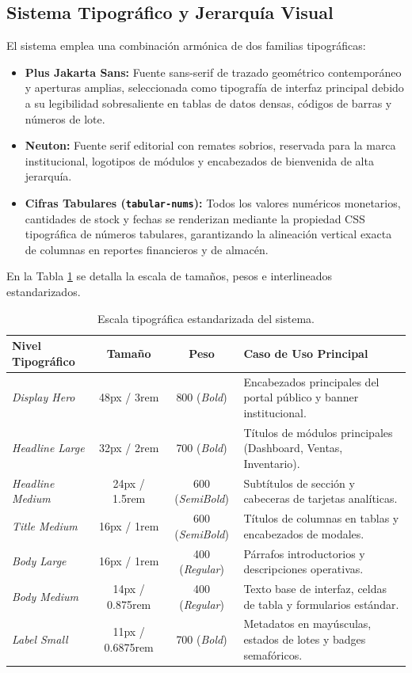 \subsection{Sistema Tipográfico y Jerarquía Visual}
El sistema emplea una combinación armónica de dos familias tipográficas:
\begin{itemize}
    \item \textbf{Plus Jakarta Sans:} Fuente sans-serif de trazado geométrico contemporáneo y aperturas amplias, seleccionada como tipografía de interfaz principal debido a su legibilidad sobresaliente en tablas de datos densas, códigos de barras y números de lote.
    \item \textbf{Neuton:} Fuente serif editorial con remates sobrios, reservada para la marca institucional, logotipos de módulos y encabezados de bienvenida de alta jerarquía.
    \item \textbf{Cifras Tabulares (\texttt{tabular-nums}):} Todos los valores numéricos monetarios, cantidades de stock y fechas se renderizan mediante la propiedad CSS tipográfica de números tabulares, garantizando la alineación vertical exacta de columnas en reportes financieros y de almacén.
\end{itemize}

En la Tabla \ref{tab:escala_tipografica} se detalla la escala de tamaños, pesos e interlineados estandarizados.

\begin{table}[H]
\centering
\caption{Escala tipográfica estandarizada del sistema.}
\label{tab:escala_tipografica}
\renewcommand{\arraystretch}{1.2}
\begin{tabularx}{\textwidth}{|l|c|c|X|}
\hline
\rowcolor[HTML]{E5E9EB}
\textbf{Nivel Tipográfico} & \textbf{Tamaño} & \textbf{Peso} & \textbf{Caso de Uso Principal} \\ \hline
\textit{Display Hero} & 48px / 3rem & 800 (\textit{Bold}) & Encabezados principales del portal público y banner institucional. \\ \hline
\textit{Headline Large} & 32px / 2rem & 700 (\textit{Bold}) & Títulos de módulos principales (Dashboard, Ventas, Inventario). \\ \hline
\textit{Headline Medium} & 24px / 1.5rem & 600 (\textit{SemiBold}) & Subtítulos de sección y cabeceras de tarjetas analíticas. \\ \hline
\textit{Title Medium} & 16px / 1rem & 600 (\textit{SemiBold}) & Títulos de columnas en tablas y encabezados de modales. \\ \hline
\textit{Body Large} & 16px / 1rem & 400 (\textit{Regular}) & Párrafos introductorios y descripciones operativas. \\ \hline
\textit{Body Medium} & 14px / 0.875rem & 400 (\textit{Regular}) & Texto base de interfaz, celdas de tabla y formularios estándar. \\ \hline
\textit{Label Small} & 11px / 0.6875rem & 700 (\textit{Bold}) & Metadatos en mayúsculas, estados de lotes y badges semafóricos. \\ \hline
\end{tabularx}
\end{table}

